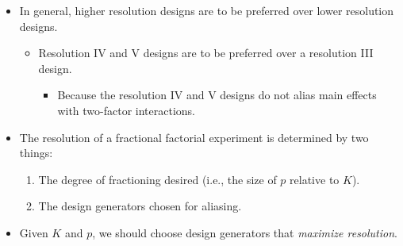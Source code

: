 \begin{itemize}[*]
    \item In general, higher resolution designs are to be preferred over lower resolution designs.
          \begin{itemize}
              \item Resolution IV and V designs are to be preferred over a resolution III design.
                    \begin{itemize}[$\hookrightarrow$]
                        \item Because the resolution IV and V designs do not alias main effects with two-factor interactions.
                    \end{itemize}
          \end{itemize}
\end{itemize}
\begin{itemize}
    \item The resolution of a fractional factorial experiment is determined by two things:
          \begin{enumerate}[1.]
              \item The degree of fractioning desired (i.e., the size of $p$ relative to $K$).
              \item The design generators chosen for aliasing.
          \end{enumerate}
\end{itemize}
\begin{itemize}[*]
    \item Given $K$ and $p$, we should choose design generators that \emph{maximize resolution}.
\end{itemize}
